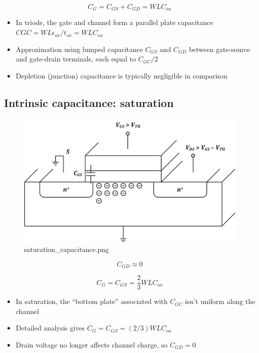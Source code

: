 \documentclass[11pt]{article}
\providecommand{\tightlist}{%
      \setlength{\itemsep}{0pt}\setlength{\parskip}{0pt}}
\begin{document}
\begin{equation}
\boxed{C_G = C_{GS} + C_{GD} = WLC_{ox}}
\end{equation}

    \begin{itemize}
\tightlist
\item
  In triode, the gate and channel form a parallel plate capacitance
  \(C{GC} = WL \epsilon_{ox}/t_{ox} = WLC_{ox}\)
\item
  Approximation using lumped capacitance \(C_{GS}\) and \(C_{GD}\)
  between gate-source and gate-drain terminals, each equal to
  \(C_{GC}/2\)
\item
  Depletion (junction) capacitance is typically negligible in comparison
\end{itemize}

    \hypertarget{intrinsic-capacitance-saturation}{%
\subsection{Intrinsic capacitance:
saturation}\label{intrinsic-capacitance-saturation}}

    \begin{figure}
\centering
\includegraphics{saturation_capacitance.png}
\caption{saturation\_capacitance.png}
\end{figure}

    \begin{equation}
C_{GD} \approx 0
\end{equation}

\begin{equation}
\boxed{C_G = C_{GS} = \dfrac{2}{3}WLC_{ox}}
\end{equation}

    \begin{itemize}
\tightlist
\item
  In saturation, the ``bottom plate'' associated with \(C_{GC}\) isn't
  uniform along the channel
\item
  Detailed analysis gives \(C_{G} = C_{GS} = (2/3) WLC_{ox}\)
\item
  Drain voltage no longer affects channel charge, so \(C_{GD} = 0\)
\end{itemize}
\end{document}
